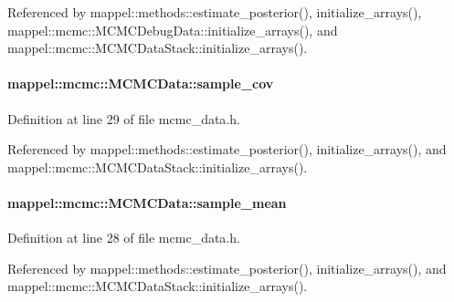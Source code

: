 Referenced by mappel\+::methods\+::estimate\+\_\+posterior(), initialize\+\_\+arrays(), mappel\+::mcmc\+::\+M\+C\+M\+C\+Debug\+Data\+::initialize\+\_\+arrays(), and mappel\+::mcmc\+::\+M\+C\+M\+C\+Data\+Stack\+::initialize\+\_\+arrays().

\paragraph[{\texorpdfstring{sample\+\_\+cov}{sample_cov}}]{ mappel\+::mcmc\+::\+M\+C\+M\+C\+Data\+::sample\+\_\+cov}\hypertarget{structmappel_1_1mcmc_1_1MCMCData_a1703e010b2e55dd1c2e43886022dd311}{}\label{structmappel_1_1mcmc_1_1MCMCData_a1703e010b2e55dd1c2e43886022dd311}


Definition at line 29 of file mcmc\+\_\+data.\+h.



Referenced by mappel\+::methods\+::estimate\+\_\+posterior(), initialize\+\_\+arrays(), and mappel\+::mcmc\+::\+M\+C\+M\+C\+Data\+Stack\+::initialize\+\_\+arrays().

\paragraph[{\texorpdfstring{sample\+\_\+mean}{sample_mean}}]{ mappel\+::mcmc\+::\+M\+C\+M\+C\+Data\+::sample\+\_\+mean}\hypertarget{structmappel_1_1mcmc_1_1MCMCData_a89c09929c6a2a7695e5360559bc72b83}{}\label{structmappel_1_1mcmc_1_1MCMCData_a89c09929c6a2a7695e5360559bc72b83}


Definition at line 28 of file mcmc\+\_\+data.\+h.



Referenced by mappel\+::methods\+::estimate\+\_\+posterior(), initialize\+\_\+arrays(), and mappel\+::mcmc\+::\+M\+C\+M\+C\+Data\+Stack\+::initialize\+\_\+arrays().

